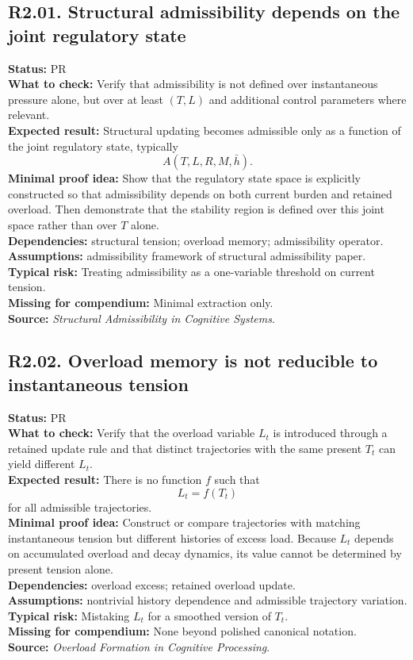 \documentclass[12pt]{article}
\begin{document}
	\subsection*{R2.01. Structural admissibility depends on the joint regulatory state}
	\textbf{Status:} PR \\
	\textbf{What to check:} Verify that admissibility is not defined over instantaneous pressure alone, but over at least $(T,L)$ and additional control parameters where relevant. \\
	\textbf{Expected result:} Structural updating becomes admissible only as a function of the joint regulatory state, typically
	\[
	A(T,L,R,M,\bar h).
	\]
	\textbf{Minimal proof idea:} Show that the regulatory state space is explicitly constructed so that admissibility depends on both current burden and retained overload. Then demonstrate that the stability region is defined over this joint space rather than over $T$ alone. \\
	\textbf{Dependencies:} structural tension; overload memory; admissibility operator. \\
	\textbf{Assumptions:} admissibility framework of structural admissibility paper. \\
	\textbf{Typical risk:} Treating admissibility as a one-variable threshold on current tension. \\
	\textbf{Missing for compendium:} Minimal extraction only. \\
	\textbf{Source:} \emph{Structural Admissibility in Cognitive Systems}.
	
	\subsection*{R2.02. Overload memory is not reducible to instantaneous tension}
	\textbf{Status:} PR \\
	\textbf{What to check:} Verify that the overload variable $L_t$ is introduced through a retained update rule and that distinct trajectories with the same present $T_t$ can yield different $L_t$. \\
	\textbf{Expected result:} There is no function $f$ such that
	\[
	L_t=f(T_t)
	\]
	for all admissible trajectories. \\
	\textbf{Minimal proof idea:} Construct or compare trajectories with matching instantaneous tension but different histories of excess load. Because $L_t$ depends on accumulated overload and decay dynamics, its value cannot be determined by present tension alone. \\
	\textbf{Dependencies:} overload excess; retained overload update. \\
	\textbf{Assumptions:} nontrivial history dependence and admissible trajectory variation. \\
	\textbf{Typical risk:} Mistaking $L_t$ for a smoothed version of $T_t$. \\
	\textbf{Missing for compendium:} None beyond polished canonical notation. \\
	\textbf{Source:} \emph{Overload Formation in Cognitive Processing}.
	
\end{document}
